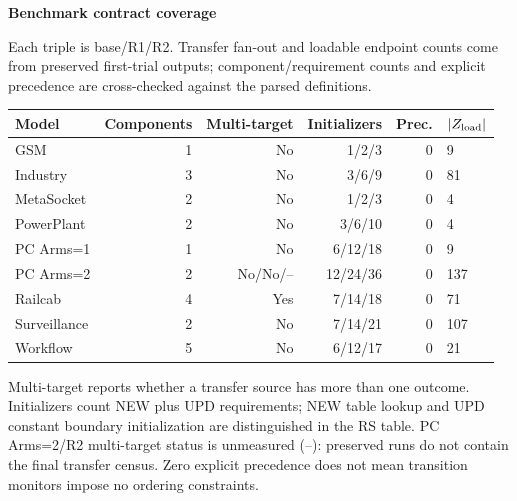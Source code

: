 \noindent\textbf{Benchmark contract coverage}\par
Each triple is base/R1/R2. Transfer fan-out and loadable endpoint counts come from preserved first-trial outputs; component/requirement counts and explicit precedence are cross-checked against the parsed definitions.
\begin{center}\scriptsize\begin{tabular}{@{}lrrrrl@{}}\toprule
Model & Components & Multi-target & Initializers & Prec. & $|Z_{\rm load}|$\\\midrule
GSM & 1 & No & 1/2/3 & 0 & 9\\
Industry & 3 & No & 3/6/9 & 0 & 81\\
MetaSocket & 2 & No & 1/2/3 & 0 & 4\\
PowerPlant & 2 & No & 3/6/10 & 0 & 4\\
PC Arms=1 & 1 & No & 6/12/18 & 0 & 9\\
PC Arms=2 & 2 & No/No/-- & 12/24/36 & 0 & 137\\
Railcab & 4 & Yes & 7/14/18 & 0 & 71\\
Surveillance & 2 & No & 7/14/21 & 0 & 107\\
Workflow & 5 & No & 6/12/17 & 0 & 21\\
\bottomrule\end{tabular}\end{center}
Multi-target reports whether a transfer source has more than one outcome. Initializers count NEW plus UPD requirements; NEW table lookup and UPD constant boundary initialization are distinguished in the RS table. PC Arms=2/R2 multi-target status is unmeasured (--): preserved runs do not contain the final transfer census. Zero explicit precedence does not mean transition monitors impose no ordering constraints.
